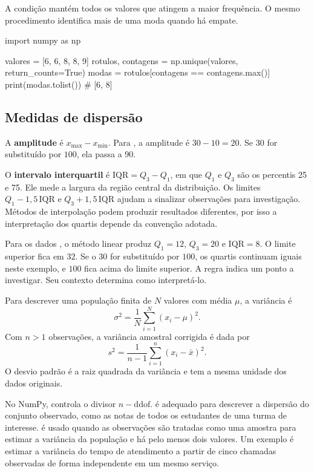 A condição  mantém todos os valores que atingem a maior frequência. O mesmo procedimento identifica mais de uma moda quando há empate.

\begin{exemplo}
import numpy as np

valores = [6, 6, 8, 8, 9]
rotulos, contagens = np.unique(valores, return_counts=True)
modas = rotulos[contagens == contagens.max()]
print(modas.tolist())  # [6, 8]
\end{exemplo}

\subsection{Medidas de dispersão}

A \textbf{amplitude} é \(x_{\max}-x_{\min}\). Para \codigo{[10, 12, 15, 20, 30]}, a amplitude é \(30-10=20\). Se \(30\) for substituído por \(100\), ela passa a \(90\).

O \textbf{intervalo interquartil} é \(\mathrm{IQR}=Q_3-Q_1\), em que \(Q_1\) e \(Q_3\) são os percentis 25 e 75. Ele mede a largura da região central da distribuição. Os limites \(Q_1-1{,}5\,\mathrm{IQR}\) e \(Q_3+1{,}5\,\mathrm{IQR}\) ajudam a sinalizar observações para investigação. Métodos de interpolação podem produzir resultados diferentes, por isso a interpretação dos quartis depende da convenção adotada.


Para os dados \codigo{[10, 12, 15, 20, 30]}, o método linear produz \(Q_1=12\), \(Q_3=20\) e \(\mathrm{IQR}=8\). O limite superior fica em \(32\). Se o \(30\) for substituído por \(100\), os quartis continuam iguais neste exemplo, e \(100\) fica acima do limite superior. A regra indica um ponto a investigar. Seu contexto determina como interpretá-lo.

Para descrever uma população finita de \(N\) valores com média \(\mu\), a variância é
\[
  \sigma^2 = \frac{1}{N}\sum_{i=1}^{N}(x_i-\mu)^2.
\]
Com \(n>1\) observações, a variância amostral corrigida é dada por
\[
  s^2 = \frac{1}{n-1}\sum_{i=1}^{n}(x_i-\bar{x})^2.
\]
O desvio padrão é a raiz quadrada da variância e tem a mesma unidade dos dados originais.

No NumPy,  controla o divisor \(n-\mathrm{ddof}\).  é adequado para descrever a dispersão do conjunto observado, como as notas de todos os estudantes de uma turma de interesse.  é usado quando as observações são tratadas como uma amostra para estimar a variância da população e há pelo menos dois valores. Um exemplo é estimar a variância do tempo de atendimento a partir de cinco chamadas observadas de forma independente em um mesmo serviço.

